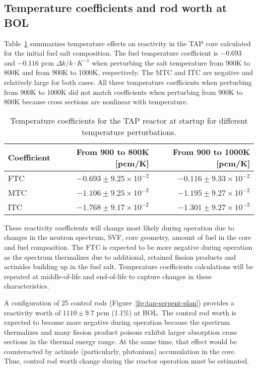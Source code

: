 \subsection{Temperature coefficients and rod worth at BOL}
Table~\ref{tab:tcoef} summarizes temperature effects on reactivity in the 
\gls{TAP} core calculated for the initial fuel salt composition. The fuel 
temperature coefficient is $-0.693$ and $-0.116$ pcm $\Delta k/k\cdot K^{-1}$ 
when perturbing the salt temperature from 900K to 800K and from 900K to 1000K, 
respectively. The MTC and ITC are negative and relatively large for both 
cases. All three temperature coefficients when perturbing from 900K to 
1000K did not match coefficients when perturbing from 900K to 800K because 
cross sections are nonlinear with temperature.

\begin{table}[ht!]
	\caption{Temperature coefficients for the \gls{TAP} reactor at startup for 
	different temperature perturbations.}
	\begin{tabularx}{\textwidth}{ X  r r } \hline
		\textbf{Coefficient} & \textbf{From 900 to 800K [pcm/K]} & 
		\textbf{From 900 to 1000K [pcm/K]}                  \tabularnewline 
		[5pt] \hline
		FTC & $-0.693\pm9.25\times10^{-2}$ & $-0.116\pm9.33\times10^{-2}$ 
		\tabularnewline [3pt] \hline
		MTC & $-1.106\pm9.25\times10^{-2}$ & $-1.195\pm9.27\times10^{-2}$  
		\tabularnewline [3pt] \hline
		ITC  & $-1.768\pm9.17\times10^{-2}$ &  $-1.301\pm9.27\times10^{-2}$  
		\tabularnewline [3pt] \hline
	\end{tabularx}
	\label{tab:tcoef}
\end{table}
These reactivity coefficients will change most likely during operation due to 
changes in the neutron spectrum, \gls{SVF}, core geometry, amount of fuel in 
the core and fuel composition. The FTC is expected to be more negative 
during operation as the spectrum thermalizes due to additional, retained  
fission products and actinides building up in the fuel salt. Temperature 
coefficients calculations will be repeated at middle-of-life and end-of-life 
to capture changes in these characteristics.

A configuration of 25 control rods (Figure~\ref{fig:tap-serpent-plan}) 
provides a reactivity worth of $1110\pm9.7$ pcm (1.1\%) at \gls{BOL}. The 
control rod worth is expected to become more negative during operation 
because the spectrum thermalizes and many fission product poisons exhibit 
larger absorption cross sections in the thermal energy range. At the same 
time, that effect would be counteracted by actinide (particularly, plutonium) 
accumulation in the core. Thus, control rod worth change during the reactor 
operation must be estimated.
